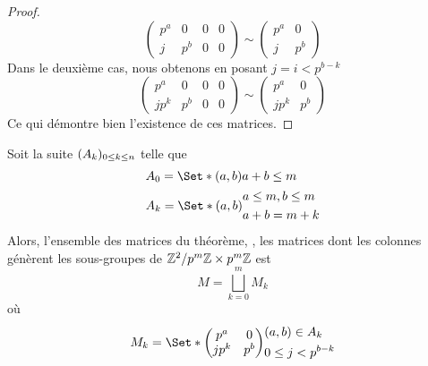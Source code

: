 \documentclass[12pt]{article}
\newcommand*{\pmZpmZ }{p^m\Z \x p^m\Z}
\newcommand*{\ZZpmZ}{\Z^2/\pmZpmZ}
\begin{document}
\begin{proof}
\begin{equation*}
\begin{pmatrix}
			p^a & 0   & 0 & 0 \\
			j   & p^b & 0 & 0
		\end{pmatrix}
		\sim
		\begin{pmatrix}
			p^a & 0   \\
			j   & p^b
		\end{pmatrix}
	\end{equation*}
	Dans le deuxième cas, nous obtenons en posant $j = i < p^{b-k}$
	\begin{equation*}
		\begin{pmatrix}
			p^a  & 0   & 0 & 0 \\
			jp^k & p^b & 0 & 0
		\end{pmatrix}
		\sim
		\begin{pmatrix}
			p^a  & 0   \\
			jp^k & p^b
		\end{pmatrix}
	\end{equation*}
	\noindent
	Ce qui démontre bien l'existence de ces matrices.

\end{proof}

\begin{corollary}\label{union_m}
	Soit la suite $(A_{k})_{0 \le k \le n}$ telle que
	\begin{equation*}
		\begin{split}
			&A_0 = \Set*{(a,b)}{ a + b \le m}\\
			&A_k = \Set*{
				(a,b)}{
				\begin{aligned}
					 & a \le m, b \le m \\
					 & a + b = m + k
				\end{aligned}
			}
		\end{split}
	\end{equation*}
	Alors, l'ensemble des matrices du théorème, \cad, les matrices dont les colonnes
	génèrent les sous-groupes de $\ZZpmZ$ est
	$$M = \bigsqcup_{k = 0}^mM_k$$
	où
	\begin{equation*}
		M_k = \Set*{
			\begin{pmatrix}
				p^a  & 0   \\
				jp^k & p^b
			\end{pmatrix}
		}{
			\begin{aligned}
				 & (a, b) \in A_k      \\
				 & 0 \le j < p^{b - k}
			\end{aligned}
		}
	\end{equation*}
\end{corollary}
\end{document}
